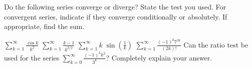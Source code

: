 \documentclass[12pt]{exam}
\newcommand{\sk}{\sum_{k=1}^\infty}
\begin{document}
Do the following series converge or diverge?  State the 
test you used.  For convergent series, indicate if they
 converge conditionally or absolutely.  If appropriate,
find the sum.


\begin{questions}

\question $\displaystyle{\sk \frac {\cos k}{k^2}}$
\vspace{1.3in}
\question $\displaystyle{\sk\frac {k-1}{k^{3/2}}}$
\vspace{1.3in}
\question $\displaystyle{\sk k \;{\sin\left(\frac{1}{k}\right)}}$
\vspace{1.3in}
\question $\displaystyle{ \sk \frac {(-1)^k 7^{2k}}{(2k)!}}$
\vspace{1.5in}
\question Can the ratio test be used for the series 
$\displaystyle \sum_{k=0}^\infty 
 \frac{(-1)^k k^2}{3^k}$?  Completely explain your answer.





\end{questions}
\end{document}
